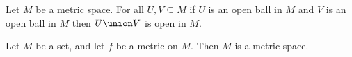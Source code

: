 \begin{lemma}\label{union_of_open_balls_is_open}
    Let $M$ be a metric space.
    For all $U,V \subseteq M$ if $U$ is an open ball in $M$ and $V$ is an open ball in $M$ then $U \union V$ is open in $M$.
\end{lemma}







\begin{lemma}\label{metric_implies_topology}
    Let $M$ be a set, and let $f$ be a metric on $M$.
    Then $M$ is a metric space.
\end{lemma}








